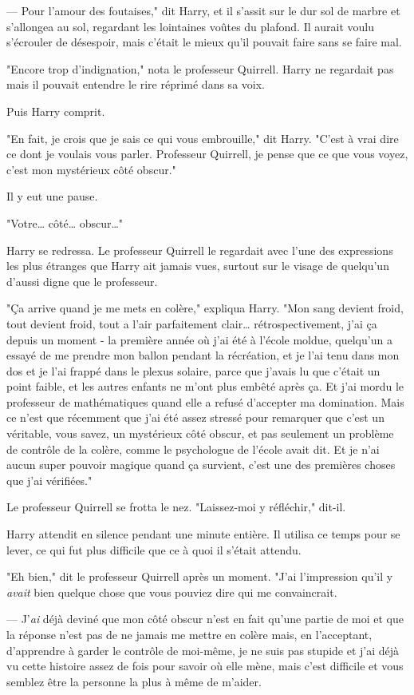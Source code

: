 --- Pour l'amour des foutaises," dit Harry, et il s'assit sur le dur sol de marbre et s'allongea au sol, regardant les lointaines voûtes du plafond. Il aurait voulu s'écrouler de désespoir, mais c'était le mieux qu'il pouvait faire sans se faire mal.

"Encore trop d'indignation," nota le professeur Quirrell. Harry ne regardait pas mais il pouvait entendre le rire réprimé dans sa voix.

Puis Harry comprit.

"En fait, je crois que je sais ce qui vous embrouille," dit Harry. "C'est à vrai dire ce dont je voulais vous parler. Professeur Quirrell, je pense que ce que vous voyez, c'est mon mystérieux côté obscur."

Il y eut une pause.

"Votre… côté… obscur…"

Harry se redressa. Le professeur Quirrell le regardait avec l'une des expressions les plus étranges que Harry ait jamais vues, surtout sur le visage de quelqu'un d'aussi digne que le professeur.

"Ça arrive quand je me mets en colère," expliqua Harry. "Mon sang devient froid, tout devient froid, tout a l'air parfaitement clair… rétrospectivement, j'ai ça depuis un moment - la première année où j'ai été à l'école moldue, quelqu'un a essayé de me prendre mon ballon pendant la récréation, et je l'ai tenu dans mon dos et je l'ai frappé dans le plexus solaire, parce que j'avais lu que c'était un point faible, et les autres enfants ne m'ont plus embêté après ça. Et j'ai mordu le professeur de mathématiques quand elle a refusé d'accepter ma domination. Mais ce n'est que récemment que j'ai été assez stressé pour remarquer que c'est un véritable, vous savez, un mystérieux côté obscur, et pas seulement un problème de contrôle de la colère, comme le psychologue de l'école avait dit. Et je n'ai aucun super pouvoir magique quand ça survient, c'est une des premières choses que j'ai vérifiées."

Le professeur Quirrell se frotta le nez. "Laissez-moi y réfléchir," dit-il.

Harry attendit en silence pendant une minute entière. Il utilisa ce temps pour se lever, ce qui fut plus difficile que ce à quoi il s'était attendu.

"Eh bien," dit le professeur Quirrell après un moment. "J'ai l'impression qu'il y \emph{avait} bien quelque chose que vous pouviez dire qui me convaincrait.

--- J'\emph{ai} déjà deviné que mon côté obscur n'est en fait qu'une partie de moi et que la réponse n'est pas de ne jamais me mettre en colère mais, en l'acceptant, d'apprendre à garder le contrôle de moi-même, je ne suis pas stupide et j'ai déjà vu cette histoire assez de fois pour savoir où elle mène, mais c'est difficile et vous semblez être la personne la plus à même de m'aider.

